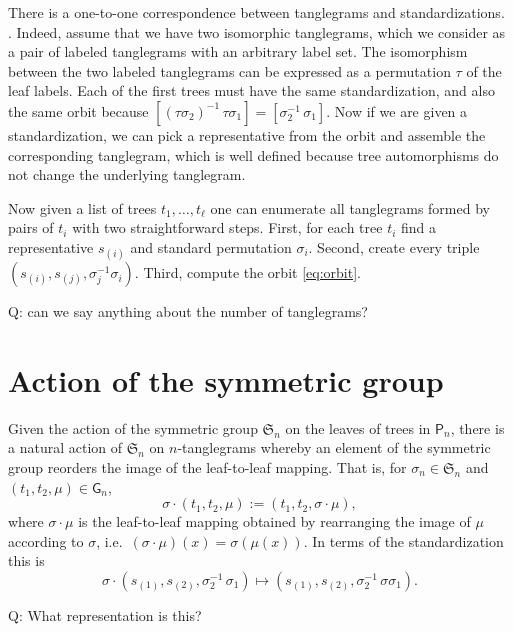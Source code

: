 \documentclass{amsart}
\newcommand{\fS}{\mathfrak S}
\newcommand{\pairing}{\mu}
\newcommand{\tangle}{\mathsf{G}}
\newcommand{\ptree}{\mathsf{P}}
\begin{document}
There is a one-to-one correspondence between tanglegrams and standardizations.
.
Indeed, assume that we have two isomorphic tanglegrams, which we consider as a pair of labeled tanglegrams with an arbitrary label set.
The isomorphism between the two labeled tanglegrams can be expressed as a permutation $\tau$ of the leaf labels.
Each of the first trees must have the same standardization, and also the same orbit because $[\left(\tau \sigma_2\right)^{-1} \, \tau \sigma_1] = [\sigma_2^{-1} \, \sigma_1]$.
Now if we are given a standardization, we can pick a representative from the orbit and assemble the corresponding tanglegram, which is well defined because tree automorphisms do not change the underlying tanglegram.

Now given a list of trees $t_1, \ldots, t_\ell$ one can enumerate all tanglegrams formed by pairs of $t_i$ with two straightforward steps.
First, for each tree $t_i$ find a representative $s_{(i)}$ and standard permutation $\sigma_i$.
Second, create every triple $(s_{(i)}, s_{(j)}, \sigma_j^{-1} \sigma_i)$.
Third, compute the orbit \eqref{eq:orbit}.

Q: can we say anything about the number of tanglegrams?


\section{Action of the symmetric group}

Given the action of the symmetric group $\fS_n$ on the leaves of trees in $\ptree_n$, there is a natural action of $\fS_n$ on $n$-tanglegrams whereby an element of the symmetric group reorders the image of the leaf-to-leaf mapping.
That is, for $\sigma_n \in \fS_n$ and $(t_1, t_2, \pairing) \in \tangle_n$,
\[
\sigma \cdot (t_1, t_2, \pairing) := (t_1, t_2, \sigma \cdot \pairing),
\]
where $\sigma \cdot \pairing$ is the leaf-to-leaf mapping obtained by rearranging the image of $\pairing$ according to $\sigma$, i.e.\ $(\sigma \cdot \pairing)(x) = \sigma(\pairing(x))$.
In terms of the standardization this is
\[
\sigma \cdot (s_{(1)}, s_{(2)}, \sigma_2^{-1} \, \sigma_1) \mapsto (s_{(1)}, s_{(2)}, \sigma_2^{-1} \, \sigma \sigma_1).
\]

Q: What representation is this?




\end{document}
